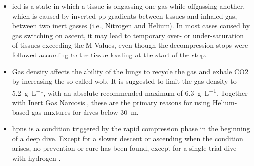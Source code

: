\begin{itemize}
    \item \gls{icd} is a state in which a tissue is ongassing one gas while offgassing another, which is caused by inverted \gls{pp} gradients between tissues and inhaled gas, between two inert gasses (i.e., Nitrogen and Helium). 
    In most cases caused by gas switching on ascent, it may lead to temporary over- or under-saturation of tissues exceeding the M-Values, even though the decompression stops were followed according to the tissue loading at the start of the stop. \cite{icd-2011}
    \item Gas density affects the ability of the lungs to recycle the gas and exhale CO2 \cite{respiratory-physiology-ccr-2015} by increasing the so-called \gls{wob}. 
    It is suggested to limit the gas density to \SI{5.2}{\gram\per\liter}, with an absolute recommended maximum of \SI{6.3}{\gram\per\liter}.
    Together with Inert Gas Narcosis \cite{inert-gas-narcosis}, these are the primary reasons for using Helium-based gas mixtures for dives below \SI{30}{\meter}.
    \item \gls{hpns} \cite{hpns-susceptibility-1983} is a condition triggered by the rapid compression phase in the beginning of a deep dive. 
    Except for a slower descent or ascending when the condition arises, no prevention or cure has been found, except for a single trial dive with hydrogen \cite{hydrogen-dive-2024}.
\end{itemize}
